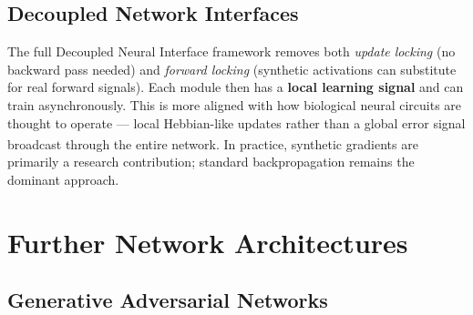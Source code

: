 \subsection{Decoupled Network Interfaces}

\begin{tcbitemize}[ skin=sectionraster ]
    \tcbitem[title={Local Learning Signals}, raster multicolumn=6]
    The full Decoupled Neural Interface framework removes both \emph{update locking} (no backward pass needed) and \emph{forward locking} (synthetic activations can substitute for real forward signals).
    Each module then has a \textbf{local learning signal} and can train asynchronously.
    This is more aligned with how biological neural circuits are thought to operate --- local Hebbian-like updates rather than a global error signal broadcast through the entire network\textsuperscript{\cite[][p.~2]{fischerVorlesungGrundlagenNeuronale2024}}.
    In practice, synthetic gradients are primarily a research contribution; standard backpropagation remains the dominant approach.
\end{tcbitemize}


\section{Further Network Architectures}

\subsection{Generative Adversarial Networks}

